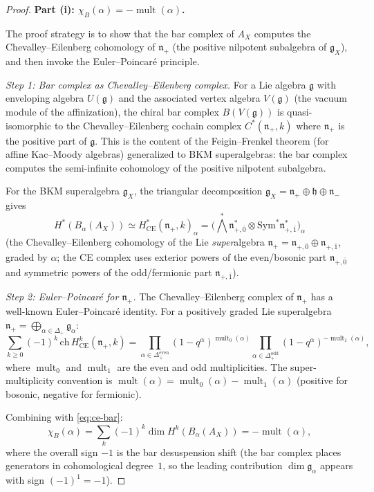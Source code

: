 \documentclass[11pt]{amsart}
\theoremstyle{definition}
\theoremstyle{remark}
\DeclareMathOperator{\mult}{mult}
\newcommand{\fg}{\mathfrak{g}}
\newcommand{\fh}{\mathfrak{h}}
\newcommand{\fn}{\mathfrak{n}}
\begin{document}
\begin{proof}
\textbf{Part (i): $\chi_B(\alpha) = -\mult(\alpha)$.}

The proof strategy is to show that the bar complex of $A_X$
computes the Chevalley--Eilenberg cohomology of $\fn_+$
(the positive nilpotent subalgebra of $\fg_X$), and then
invoke the Euler--Poincar\'e principle.

\emph{Step 1: Bar complex as Chevalley--Eilenberg complex.}
For a Lie algebra $\fg$ with enveloping algebra $U(\fg)$ and
the associated vertex algebra $V(\fg)$ (the vacuum module of
the affinization), the chiral bar complex $B(V(\fg))$ is
quasi-isomorphic to the Chevalley--Eilenberg cochain complex
$C^*(\fn_+, k)$ where $\fn_+$ is the positive part of $\fg$.
This is the content of the Feigin--Frenkel theorem (for affine
Kac--Moody algebras) generalized to BKM superalgebras: the bar
complex computes the semi-infinite cohomology of the positive
nilpotent subalgebra.

For the BKM superalgebra $\fg_X$, the triangular decomposition
$\fg_X = \fn_+ \oplus \fh \oplus \fn_-$ gives
\begin{equation}\label{eq:ce-bar}
 H^*(B_\alpha(A_X)) \simeq H^*_{\mathrm{CE}}(\fn_+, k)_\alpha
 = \bigl(\bigwedge^* \fn_{+,\bar{0}}^* \otimes \mathrm{Sym}^* \fn_{+,\bar{1}}^*\bigr)_\alpha
\end{equation}
(the Chevalley--Eilenberg cohomology of the Lie \emph{super}algebra
$\fn_+ = \fn_{+,\bar{0}} \oplus \fn_{+,\bar{1}}$, graded by $\alpha$;
the CE complex uses exterior powers of the even/bosonic part
$\fn_{+,\bar{0}}$ and symmetric powers of the odd/fermionic part
$\fn_{+,\bar{1}}$).

\emph{Step 2: Euler--Poincar\'e for $\fn_+$.}
The Chevalley--Eilenberg complex of $\fn_+$ has a well-known
Euler--Poincar\'e identity. For a positively graded Lie
superalgebra $\fn_+ = \bigoplus_{\alpha \in \Delta_+} \fg_\alpha$:
\begin{equation}\label{eq:euler-poincare}
 \sum_{k \geq 0} (-1)^k \, \mathrm{ch}\, H^k_{\mathrm{CE}}(\fn_+, k)
 = \prod_{\alpha \in \Delta^{\mathrm{even}}_+}
 (1 - q^\alpha)^{\mult_0(\alpha)}
 \prod_{\alpha \in \Delta^{\mathrm{odd}}_+}
 (1 - q^\alpha)^{-\mult_1(\alpha)},
\end{equation}
where $\mult_0$ and $\mult_1$ are the even and odd
multiplicities. The super-multiplicity convention is
$\mult(\alpha) = \mult_0(\alpha) - \mult_1(\alpha)$
(positive for bosonic, negative for fermionic).

Combining with \eqref{eq:ce-bar}:
\[
 \chi_B(\alpha) = \sum_k (-1)^k \dim H^k(B_\alpha(A_X))
 = -\mult(\alpha),
\]
where the overall sign $-1$ is the bar desuspension shift
(the bar complex places generators in cohomological degree~$1$,
so the leading contribution $\dim \fg_\alpha$ appears with sign
$(-1)^1 = -1$).


\end{proof}
\end{document}

